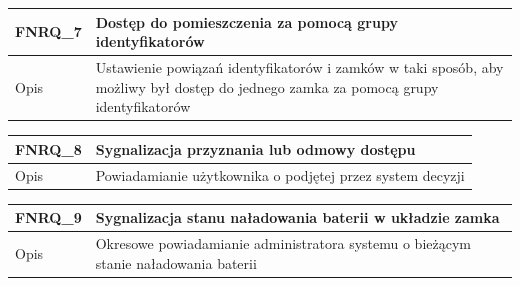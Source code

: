 \begin{table}[h!]
\begin{subtable}[c]{\textwidth}
                \vspace{10mm}           
            \end{subtable}
        \quad%
            \begin{subtable}[c]{\textwidth}
                \centering
                 \begin{tabular}{|p{2cm}|p{12cm}|}
                    \hline FNRQ\_7      & \textbf{Dostęp do pomieszczenia za pomocą grupy identyfikatorów}  \\
                    \hline \cellcolor[gray]{0.8} Opis         & Ustawienie powiązań identyfikatorów i zamków w taki sposób, aby możliwy był dostęp do jednego zamka za pomocą grupy identyfikatorów \\
                    \hline
                \end{tabular}
                \label{tbl:fnrq7}
                \vspace{10mm}           
            \end{subtable}
        \quad%
            \begin{subtable}[c]{\textwidth}
                \centering
                 \begin{tabular}{|p{2cm}|p{12cm}|}
                    \hline FNRQ\_8      & \textbf{Sygnalizacja przyznania lub odmowy dostępu}  \\
                    \hline \cellcolor[gray]{0.8} Opis         & Powiadamianie użytkownika o podjętej przez system decyzji \\
                    \hline
                \end{tabular}
                \label{tbl:fnrq8}
                \vspace{10mm}           
            \end{subtable}
        \quad%
            \begin{subtable}[c]{\textwidth}
                \centering
                 \begin{tabular}{|p{2cm}|p{12cm}|}
                    \hline FNRQ\_9      & \textbf{Sygnalizacja stanu naładowania baterii w układzie zamka} \\
                    \hline \cellcolor[gray]{0.8} Opis         & Okresowe powiadamianie administratora systemu o bieżącym stanie naładowania baterii \\
                    \hline
                \end{tabular}
                \label{tbl:fnrq9}         
            \end{subtable}
            \label{tbl:fnrq_2}
        \end{table}

